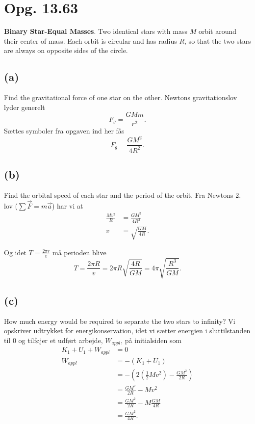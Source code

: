 \documentclass[12pt]{article}
\theoremstyle{definition}
\begin{document}
\section*{Opg. 13.63}
\textbf{Binary Star-Equal Masses}. Two identical stars with mass $M$ orbit around their center of mass. Each orbit is circular and has radius $R$, so that the two stars are always on opposite sides of the circle.

\subsection*{(a)}
Find the gravitational force of one star on the other.
\bigbreak
Newtons gravitationslov lyder generelt
\[ 
F_g = \frac{GMm}{r^2}
.\]
Sættes symboler fra opgaven ind her fås
\[ 
F_g = \frac{GM^2}{4R^2}
.\]


\subsection*{(b)}
Find the orbital speed of each star and the period of the orbit.
\bigbreak
Fra Newtons 2. lov ($\sum \Vec{F} = m \Vec{a}$) har vi at
\begin{align*}
  \frac{Mv^2}{R} &= \frac{GM^2}{4R^2} \\
  v &= \sqrt{\frac{GM}{4R}}
.\end{align*}

Og idet $T = \frac{2\pi r}{v}$ må perioden blive
\[ 
  T = \frac{2\pi R}{v} = 2\pi R \sqrt{\frac{4R}{GM}} = 4\pi \sqrt{\frac{R^3}{GM}}
.\]


\subsection*{(c)}
How much energy would be required to separate the two stars to infinity?
\bigbreak
Vi opskriver udtrykket for energikonservation, idet vi sætter energien i sluttilstanden til 0 og tilføjer et udført arbejde, $W_{appl}$, på initialsiden som
\begin{align*}
  K_1 + U_1 + W_{appl} &= 0 \\
  W_{appl} &= -(K_1 + U_1) \\
  &= - \left( 2 \left( \frac{1}{2}Mv^2 \right) - \frac{GM^2}{2R} \right) \\
  &= \frac{GM^2}{2R} - Mv^2 \\
  &= \frac{GM^2}{2R} - M \frac{GM}{4R} \\
  &= \frac{GM^2}{4R}
.\end{align*}
\end{document}
